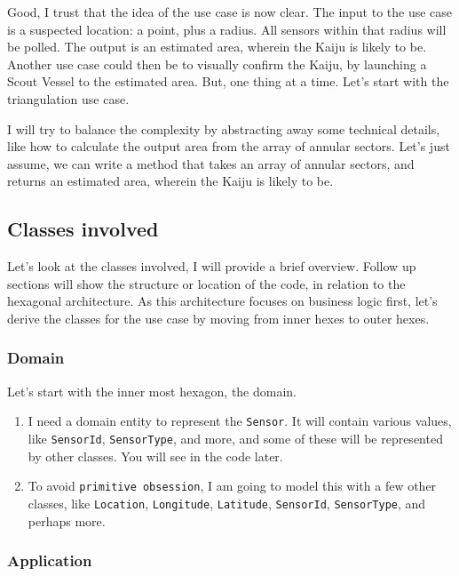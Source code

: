 Good, I trust that the idea of the use case is now clear. The input to the use case is a suspected location: a point, plus a radius. All sensors within that radius will be polled. The output is an estimated area, wherein the Kaiju is likely to be. Another use case could then be to visually confirm the Kaiju, by launching a Scout Vessel to the estimated area. But, one thing at a time. Let's start with the triangulation use case.

I will try to balance the complexity by abstracting away some technical details, like how to calculate the output area from the array of annular sectors. Let's just assume, we can write a method that takes an array of annular sectors, and returns an estimated area, wherein the Kaiju is likely to be.

\subsection{Classes involved}

Let's look at the classes involved, I will provide a brief overview. Follow up sections will show the structure or location of the code, in relation to the hexagonal architecture. As this architecture focuses on business logic first, let's derive the classes for the use case by moving from inner hexes to outer hexes.


\subsubsection{Domain}

Let's start with the inner most hexagon, the domain.

\begin{enumerate}
    \item I need a domain entity to represent the \texttt{Sensor}. It will contain various values, like \texttt{SensorId}, \texttt{SensorType}, and more, and some of these will be represented by other classes. You will see in the code later.
    \item To avoid \texttt{primitive obsession}, I am going to model this with a few other classes, like \texttt{Location}, \texttt{Longitude}, \texttt{Latitude}, \texttt{SensorId}, \texttt{SensorType}, and perhaps more.
\end{enumerate}

\subsubsection{Application}

